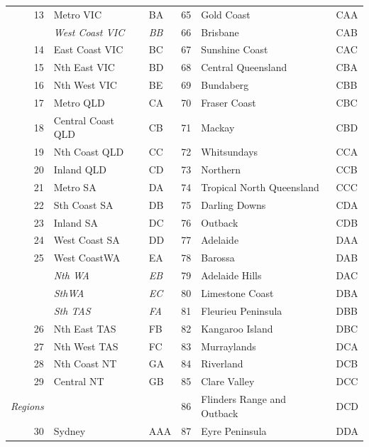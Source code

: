 \documentclass[a4paper,11pt]{article}
\theoremstyle{definition}
\begin{document}
\begin{table}[H]
\begin{tabular}{r l l|r l l}
		13     & Metro VIC     & BA   & 65      & Gold Coast  & CAA  \\
		       & \textit{West Coast VIC} & \textit{BB}    & 66      & Brisbane    & CAB  \\
		14     & East Coast VIC          & BC   & 67      & Sunshine Coast        & CAC  \\
		15     & Nth East VIC  & BD   & 68      & Central Queensland    & CBA  \\
		16     & Nth West VIC  & BE   & 69      & Bundaberg   & CBB  \\
		17     & Metro QLD     & CA   & 70      & Fraser Coast          & CBC  \\
		18     & Central Coast QLD       & CB   & 71      & Mackay      & CBD  \\
		19     & Nth Coast QLD & CC   & 72      & Whitsundays & CCA  \\
		20     & Inland QLD    & CD   & 73      & Northern    & CCB  \\
		21     & Metro SA      & DA   & 74      & Tropical North Queensland       & CCC  \\
		22     & Sth Coast SA  & DB   & 75      & Darling Downs         & CDA  \\
		23     & Inland SA     & DC   & 76      & Outback     & CDB  \\
		24     & West Coast SA & DD   & 77      & Adelaide    & DAA  \\
		25     & West CoastWA  & EA   & 78      & Barossa     & DAB  \\
		       & \textit{Nth WA}         & \textit{EB}    & 79      & Adelaide Hills        & DAC  \\
		       & \textit{SthWA}          & \textit{EC}    & 80      & Limestone Coast       & DBA  \\
		       & \textit{Sth TAS}        & \textit{FA}    & 81      & Fleurieu Peninsula    & DBB  \\
		26     & Nth East TAS  & FB   & 82      & Kangaroo Island       & DBC  \\
		27     & Nth West TAS  & FC   & 83      & Murraylands & DCA  \\
		28     & Nth Coast NT  & GA   & 84      & Riverland   & DCB  \\
		29     & Central NT    & GB   & 85      & Clare Valley          & DCC  \\
		\cline{1-3}
		\multicolumn{1}{l}{\textit{Regions}} &     &      & 86      & Flinders Range and Outback      & DCD  \\
		30     & Sydney        & AAA  & 87      & Eyre Peninsula        & DDA  \\

\end{tabular}
\end{table}
\end{document}
